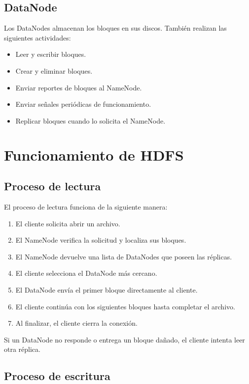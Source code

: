 \subsection{DataNode}

Los DataNodes almacenan los bloques en sus discos. También realizan las
siguientes actividades:

\begin{itemize}
    \item Leer y escribir bloques.
    \item Crear y eliminar bloques.
    \item Enviar reportes de bloques al NameNode.
    \item Enviar señales periódicas de funcionamiento.
    \item Replicar bloques cuando lo solicita el NameNode.
\end{itemize}

\section{Funcionamiento de HDFS}

\subsection{Proceso de lectura}

El proceso de lectura funciona de la siguiente manera:

\begin{enumerate}
    \item El cliente solicita abrir un archivo.
    \item El NameNode verifica la solicitud y localiza sus bloques.
    \item El NameNode devuelve una lista de DataNodes que poseen las réplicas.
    \item El cliente selecciona el DataNode más cercano.
    \item El DataNode envía el primer bloque directamente al cliente.
    \item El cliente continúa con los siguientes bloques hasta completar el
    archivo.
    \item Al finalizar, el cliente cierra la conexión.
\end{enumerate}

Si un DataNode no responde o entrega un bloque dañado, el cliente intenta leer
otra réplica.

\subsection{Proceso de escritura}

